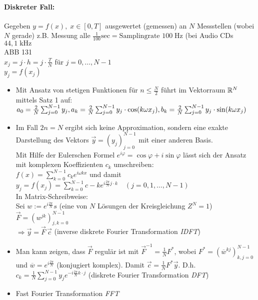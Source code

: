 \paragraph{Diskreter Fall:} Gegeben $y=f(x), \; x\in [0,T]$ ausgewertet (gemessen) an $N$ Messstellen (wobei $N$ gerade) z.B. Messung alle $\frac{1}{100}\mathrm{sec}=\text{Samplingrate }100\; \mathrm{Hz}$ (bei Audio CDs $44,1\; \mathrm{kHz}$\\
ABB 131\\
$x_j = j\cdot h = j \cdot \frac{T}{N}$ für $j=0, \dots, N-1$\\
$y_j = f(x_j)$
\begin{itemize}
\item Mit Ansatz von stetigen Funktionen für $n\leq \frac{N}{2}$ führt im Vektorraum $\mathbb{R}^N$ mittels Satz 1 auf: \\
$a_0=\frac{2}{N}\sum_{j=0}^{N-1} y_j, \; \\
a_k = \frac{2}{N}\sum_{j=0}^{N-1} y_j \cdot \cos (k \omega x_j), \; \\
b_k = \frac{2}{N} \sum_{j=0}^{N-1} y_j \cdot \sin (k \omega x_j)$
\item Im Fall $2n = N$ ergibt sich keine Approximation, sondern eine exakte Darstellung des Vektors $\vec{y}=\left(y_j\right)_{j=0}^{N-1}$ mit einer anderen Basis.\\
Mit Hilfe der Eulerschen Formel $e^{i\varphi}=\cos \varphi + i \sin \varphi$ lässt sich der Ansatz mit komplexen Koeffizienten $c_k$ umschreiben:\\
$f(x)=\sum_{k=0}^{N-1} c_k e^{i\omega k x}$ und damit $y_j=f(x_j) = \sum_{k=0}^{N-1} c-k e^{i\frac{2\pi}{N}j\cdot k} \quad (j=0,1,\dots, N-1)$\\
In Matrix-Schreibweise:\\
Sei $ w:= e^{i\frac{2\pi}{N}}s$ (eine von $N$ Lösungen der Kreisgleichung $Z^N=1$)\\
$\vec{F}=\left( w^{jk}\right)_{j,k=0}^{N-1}$\\
$\Rightarrow \vec{y}=\vec{F}\, \vec{c}$ (inverse diskrete Fourier Transformation \emph{IDFT})
\item Man kann zeigen, dass $\vec{F}$ regulär ist mit $\vec{F}^{-1}=\frac{1}{N}F^*$, wobei $F^*=\left(\overline{w}^{kj}\right)_{k,j=0}^{N-1}$ und $\overline{w}=e^{i\frac{2\pi}{N}}$ (konjugiert komplex). Damit $\vec{c}=\frac{1}{N}F^*\vec{y}$. D.h. $\boxed{c_k = \frac{1}{N}\sum_{j=0}^{N-1} y_j e^{-i\frac{2\pi}{N}k\cdot j}}$ (diskrete Fourier Transformation \emph{DFT})
\item Fast Fourier Transformation \emph{FFT}\\

\end{itemize}
